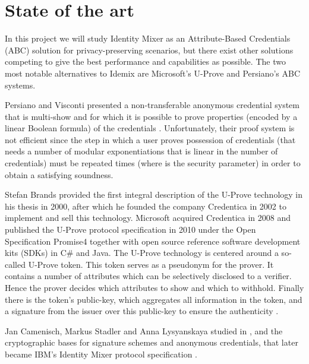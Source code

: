 
\section{State of the art}\label{ch:stateoftheart}

In this project we will study Identity Mixer as an Attribute-Based Credentials (ABC) solution for privacy-preserving scenarios, but there exist other solutions competing to give the best performance and capabilities as possible. The two most notable alternatives to Idemix are Microsoft's U-Prove and Persiano's ABC systems.




Persiano and Visconti presented a non-transferable anonymous
credential system that is multi-show and for which it is possible to prove
properties (encoded by a linear Boolean formula) of the credentials \cite{book:185217}. Unfortunately, their proof system is not efficient since the step in which a user proves
possession of credentials (that needs a number of modular exponentiations that
is linear in the number of credentials) must be repeated times (where is the
security parameter) in order to obtain a satisfying soundness.





Stefan Brands provided the first integral description of the U-Prove
technology in his thesis \cite{uprove} in 2000, after which he founded the company Credentica
in 2002 to implement and sell this technology. Microsoft acquired Credentica
in 2008 and published the U-Prove protocol specification \cite{uprove2} in 2010
under the Open Specification Promise4 together with open source reference software
development kits (SDKs) in C\# and Java.
The U-Prove technology is centered around a so-called U-Prove token. This
token serves as a pseudonym for the prover. It contains a number of attributes
which can be selectively disclosed to a verifier. Hence the prover decides which
attributes to show and which to withhold. Finally there is the token’s public-key, which aggregates all information in the token, and a signature from the issuer
over this public-key to ensure the authenticity \cite{book:947508}.



\hfil

Jan Camenisch, Markus Stadler and Anna Lysyanskaya studied in \cite{Camenisch:GroupSig}, \cite{Camenisch:AnonCred} and \cite{camenisch2002signature} the cryptographic bases for signature schemes and anonymous credentials, that later became IBM's Identity Mixer protocol specification \cite{idemixSpec}.


